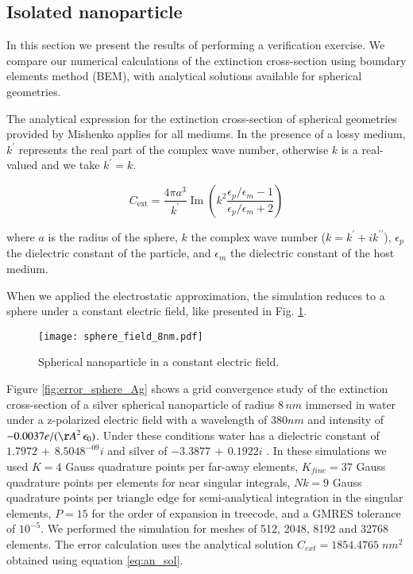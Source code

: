 
\subsection{Isolated nanoparticle} \label{sec:verification}

In this section we present the results of performing a verification exercise. We
compare our numerical calculations of the extinction cross-section using boundary
elements method (BEM), with analytical solutions available for spherical geometries. 

The analytical expression for the extinction cross-section of spherical geometries
provided by Mishenko \cite{Mishchenko2007} applies for all mediums. In the presence
of a lossy medium, $k^\prime$ represents the real part of the complex wave number,
otherwise $k$ is a real-valued and we take $k^\prime = k$. 


\begin{equation} 
    C_\text{ext} = \frac{4\pi a^3}{k^\prime} \operatorname{Im}\left(k^2 
                    \frac{\epsilon_p/\epsilon_m -1}{\epsilon_p/\epsilon_m +2}\right)
    \label{eq:an_sol}
\end{equation}

where $a$ is the radius of the sphere, $k$ the complex wave number ($k=k^\prime +i k^{\prime\prime}$), $\epsilon_p$ 
the dielectric constant of the particle, and $\epsilon_m$ the dielectric constant
of the host medium. 

When we applied the electrostatic approximation, the simulation reduces to a 
sphere under a constant electric field, like presented in Fig. \ref{fig:np_elec_field}.

\begin{figure}[h] %
   \centering
   \texttt{[image: sphere\_field\_8nm.pdf]} 
   \caption{Spherical nanoparticle in a constant electric field.}
   \label{fig:np_elec_field}
\end{figure}

Figure \ref{fig:error_sphere_Ag} shows a grid convergence study of the extinction
cross-section of a silver spherical nanoparticle of radius $8 \, nm$ immersed in water
under a z-polarized electric field with a wavelength of $380 nm$ and intensity of 
$-0.0037 e/({\AA}^2 \, \epsilon_0)$. Under these conditions water has a dielectric
constant of $1.7972 \, + \, 8.5048^{-09}i$ \cite{JohnsonChristy1972} and silver of
$-3.3877 \, + \, 0.1922i$ \cite{HaleQuerry1972}. In these simulations we used $K=4$ 
Gauss quadrature points per far-away elements, $K_{fine} = 37$ Gauss quadrature points
per elements for near singular integrals, $Nk = 9$ Gauss quadrature points per 
triangle edge for semi-analytical integration in the singular elements, $P=15$ for 
the order of expansion in treecode, and a GMRES tolerance of $10^{-5}$. We
performed the simulation for meshes of 512, 2048, 8192 and 32768 elements. The 
error calculation uses the analytical solution $C_{ext} = 1854.4765 \; nm^2$ 
obtained using equation \eqref{eq:an_sol}.

